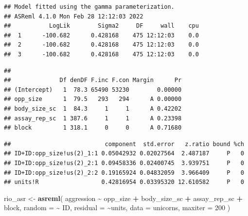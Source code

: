 \documentclass[
  12pt,
]{book}
\newenvironment{Shaded}{\begin{snugshade}}{\end{snugshade}}
\newcommand{\DataTypeTok}[1]{\textcolor[rgb]{0.13,0.29,0.53}{#1}}
\newcommand{\DecValTok}[1]{\textcolor[rgb]{0.00,0.00,0.81}{#1}}
\newcommand{\KeywordTok}[1]{\textcolor[rgb]{0.13,0.29,0.53}{\textbf{#1}}}
\newcommand{\NormalTok}[1]{#1}
\newcommand{\OperatorTok}[1]{\textcolor[rgb]{0.81,0.36,0.00}{\textbf{#1}}}
\newcommand{\StringTok}[1]{\textcolor[rgb]{0.31,0.60,0.02}{#1}}
\begin{document}
\begin{verbatim}
## Model fitted using the gamma parameterization.
## ASReml 4.1.0 Mon Feb 28 12:12:03 2022
##           LogLik        Sigma2     DF     wall    cpu
##  1      -100.682      0.428168    475 12:12:03    0.0
##  2      -100.682      0.428168    475 12:12:03    0.0
##  3      -100.682      0.428168    475 12:12:03    0.0
\end{verbatim}

\begin{verbatim}
## 
##              Df denDF F.inc F.con Margin      Pr
## (Intercept)   1  78.3 65490 53230        0.00000
## opp_size      1  79.5   293   294      A 0.00000
## body_size_sc  1  84.3     1     1      A 0.42202
## assay_rep_sc  1 387.6     1     1      A 0.23398
## block         1 318.1     0     0      A 0.71680
\end{verbatim}

\begin{Shaded}
\end{Shaded}

\begin{verbatim}
##                           component  std.error   z.ratio bound %ch
## ID+ID:opp_size!us(2)_1:1 0.05042932 0.02027564  2.487187     P   0
## ID+ID:opp_size!us(2)_2:1 0.09458336 0.02400745  3.939751     P   0
## ID+ID:opp_size!us(2)_2:2 0.19165924 0.04832059  3.966409     P   0
## units!R                  0.42816954 0.03395320 12.610582     P   0
\end{verbatim}

\begin{Shaded}
\begin{Highlighting}[]
\NormalTok{rio\_asr \textless{}{-}}\StringTok{ }\KeywordTok{asreml}\NormalTok{(}
\NormalTok{  aggression }\OperatorTok{\textasciitilde{}}\StringTok{ }\NormalTok{opp\_size }\OperatorTok{+}\StringTok{ }\NormalTok{body\_size\_sc }\OperatorTok{+}\StringTok{ }\NormalTok{assay\_rep\_sc }\OperatorTok{+}\StringTok{ }\NormalTok{block,}
  \DataTypeTok{random =} \OperatorTok{\textasciitilde{}}\StringTok{ }\NormalTok{ID,}
  \DataTypeTok{residual =} \OperatorTok{\textasciitilde{}}\NormalTok{units,}
  \DataTypeTok{data =}\NormalTok{ unicorns,}
  \DataTypeTok{maxiter =} \DecValTok{200}
\NormalTok{)}
\end{Highlighting}
\end{Shaded}
\end{document}
